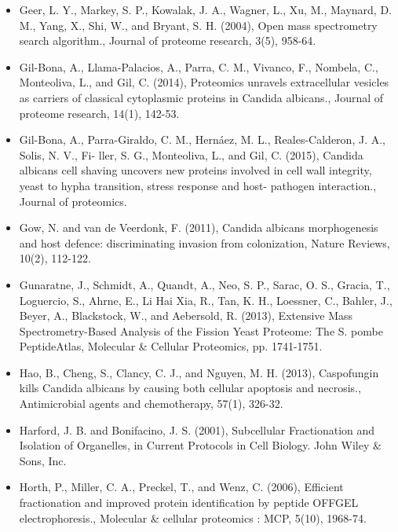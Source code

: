 \begin{itemize}
\item[]{%
Geer, L. Y., Markey, S. P., Kowalak, J. A., Wagner, L., Xu, M., Maynard, D. M., Yang, X., Shi, W.,
and Bryant, S. H. (2004), Open mass spectrometry search algorithm., Journal of proteome
research, 3(5), 958-64.
}

\item[]{%
Gil-Bona, A., Llama-Palacios, A., Parra, C. M., Vivanco, F., Nombela, C., Monteoliva, L., and
Gil, C. (2014), Proteomics unravels extracellular vesicles as carriers of classical cytoplasmic
proteins in Candida albicans., Journal of proteome research, 14(1), 142-53.
}

\item[]{%
Gil-Bona, A., Parra-Giraldo, C. M., Hernáez, M. L., Reales-Calderon, J. A., Solis, N. V., Fi-
ller, S. G., Monteoliva, L., and Gil, C. (2015), Candida albicans cell shaving uncovers new
proteins involved in cell wall integrity, yeast to hypha transition, stress response and host-
pathogen interaction., Journal of proteomics.
}


\item[]{%
Gow, N. and van de Veerdonk, F. (2011), Candida albicans morphogenesis and host defence:
discriminating invasion from colonization, Nature Reviews, 10(2), 112-122.
}

\item[]{%
Gunaratne, J., Schmidt, A., Quandt, A., Neo, S. P., Sarac, O. S., Gracia, T., Loguercio, S.,
Ahrne, E., Li Hai Xia, R., Tan, K. H., Loessner, C., Bahler, J., Beyer, A., Blackstock, W., and
Aebersold, R. (2013), Extensive Mass Spectrometry-Based Analysis of the Fission Yeast
Proteome: The S. pombe PeptideAtlas, Molecular \& Cellular Proteomics, pp. 1741-1751.
}

\item[]{%
Hao, B., Cheng, S., Clancy, C. J., and Nguyen, M. H. (2013), Caspofungin kills 
Candida albicans by causing both cellular apoptosis and necrosis.,
Antimicrobial agents and chemotherapy, 57(1), 326-32.
}

\item[]{%
Harford, J. B. and Bonifacino, J. S. (2001), 
Subcellular Fractionation and Isolation of Organelles,
in Current Protocols in Cell Biology. John Wiley \& Sons, Inc.
}

\item[]{%
Horth, P., Miller, C. A., Preckel, T., and Wenz, C. (2006), Efficient fractionation and improved
protein identification by peptide OFFGEL electrophoresis., Molecular \& cellular proteomics
: MCP, 5(10), 1968-74.
}


\end{itemize}
